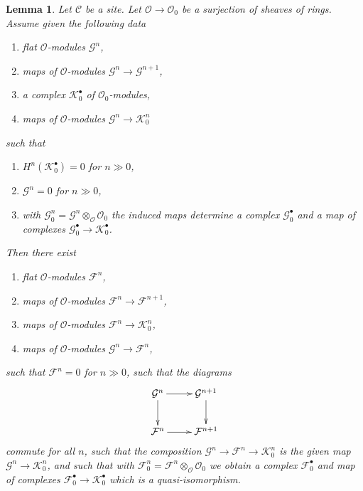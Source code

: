 \documentclass{stacks-project}
\theoremstyle{plain}
\newtheorem{lemma}[subsection]{Lemma}
\theoremstyle{definition}
\theoremstyle{remark}
\numberwithin{equation}{subsection}
\begin{document}
\begin{lemma}
\label{lemma-lift-complex}
Let $\mathcal{C}$ be a site. Let $\mathcal{O} \to \mathcal{O}_0$
be a surjection of sheaves of rings. Assume given the following data
\begin{enumerate}
\item flat $\mathcal{O}$-modules $\mathcal{G}^n$,
\item maps of $\mathcal{O}$-modules $\mathcal{G}^n \to \mathcal{G}^{n + 1}$,
\item a complex $\mathcal{K}_0^\bullet$ of $\mathcal{O}_0$-modules,
\item maps of $\mathcal{O}$-modules $\mathcal{G}^n \to \mathcal{K}_0^n$
\end{enumerate}
such that
\begin{enumerate}
\item[(a)] $H^n(\mathcal{K}_0^\bullet) = 0$ for $n \gg 0$,
\item[(b)] $\mathcal{G}^n = 0$ for $n \gg 0$,
\item[(c)] with
$\mathcal{G}^n_0 = \mathcal{G}^n \otimes_\mathcal{O} \mathcal{O}_0$
the induced maps determine a complex $\mathcal{G}_0^\bullet$ and a map
of complexes $\mathcal{G}_0^\bullet \to \mathcal{K}_0^\bullet$.
\end{enumerate}
Then there exist
\begin{enumerate}
\item[(\romannumeral1)]
flat $\mathcal{O}$-modules $\mathcal{F}^n$,
\item[(\romannumeral2)]
maps of $\mathcal{O}$-modules $\mathcal{F}^n \to \mathcal{F}^{n + 1}$,
\item[(\romannumeral3)]
maps of $\mathcal{O}$-modules $\mathcal{F}^n \to \mathcal{K}_0^n$,
\item[(\romannumeral4)]
maps of $\mathcal{O}$-modules $\mathcal{G}^n \to \mathcal{F}^n$,
\end{enumerate}
such that $\mathcal{F}^n = 0$ for $n \gg 0$, such that the diagrams
$$
\xymatrix{
\mathcal{G}^n \ar[r] \ar[d] & \mathcal{G}^{n + 1} \ar[d] \\
\mathcal{F}^n \ar[r] & \mathcal{F}^{n + 1}
}
$$
commute for all $n$, such that the composition
$\mathcal{G}^n \to \mathcal{F}^n \to \mathcal{K}_0^n$
is the given map $\mathcal{G}^n \to \mathcal{K}_0^n$, and such that with
$\mathcal{F}^n_0 = \mathcal{F}^n \otimes_\mathcal{O} \mathcal{O}_0$
we obtain a complex $\mathcal{F}_0^\bullet$ and map of complexes
$\mathcal{F}_0^\bullet \to \mathcal{K}_0^\bullet$ which is a
quasi-isomorphism.
\end{lemma}
\end{document}
